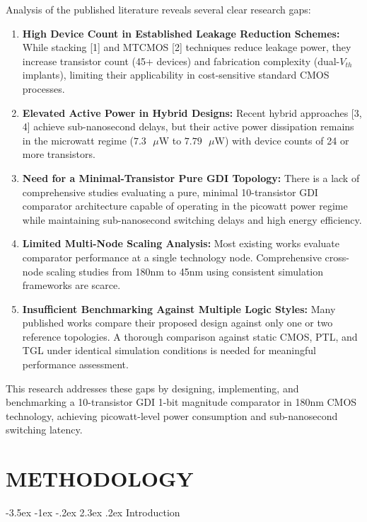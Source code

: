 \documentclass[12pt,a4paper,oneside]{report}
\makeatletter
\renewcommand\section{\@startsection {section}{1}{\z@}%
                                   {-3.5ex \@plus -1ex \@minus -.2ex}%
                                   {2.3ex \@plus.2ex}%
                                   {\normalfont\normalsize\bfseries}}
\makeatother
\begin{document}
Analysis of the published literature reveals several clear research gaps:
\begin{enumerate}
\item \textbf{High Device Count in Established Leakage Reduction Schemes:} While stacking [1] and MTCMOS [2] techniques reduce leakage power, they increase transistor count (45+ devices) and fabrication complexity (dual-$V_{th}$ implants), limiting their applicability in cost-sensitive standard CMOS processes.
\item \textbf{Elevated Active Power in Hybrid Designs:} Recent hybrid approaches [3, 4] achieve sub-nanosecond delays, but their active power dissipation remains in the microwatt regime ($7.3\text{ }\mu\text{W}$ to $7.79\text{ }\mu\text{W}$) with device counts of 24 or more transistors.
\item \textbf{Need for a Minimal-Transistor Pure GDI Topology:} There is a lack of comprehensive studies evaluating a pure, minimal 10-transistor GDI comparator architecture capable of operating in the picowatt power regime while maintaining sub-nanosecond switching delays and high energy efficiency.
\item \textbf{Limited Multi-Node Scaling Analysis:} Most existing works evaluate comparator performance at a single technology node. Comprehensive cross-node scaling studies from 180nm to 45nm using consistent simulation frameworks are scarce.
\item \textbf{Insufficient Benchmarking Against Multiple Logic Styles:} Many published works compare their proposed design against only one or two reference topologies. A thorough comparison against static CMOS, PTL, and TGL under identical simulation conditions is needed for meaningful performance assessment.
\end{enumerate}

This research addresses these gaps by designing, implementing, and benchmarking a 10-transistor GDI 1-bit magnitude comparator in 180nm CMOS technology, achieving picowatt-level power consumption and sub-nanosecond switching latency.


\chapter{METHODOLOGY}

\section{Introduction}
\end{document}
